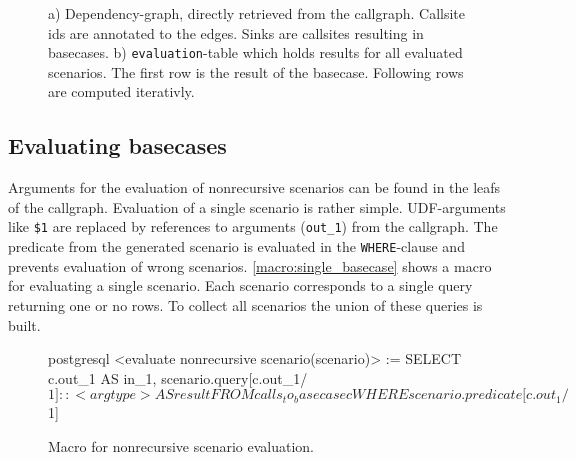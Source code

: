 \begin{figure}[h!]\small
    \begin{minipage}[b]{.45\linewidth}\small
    \centering
{}
    \subcaption{}\label{}
    \end{minipage}%
    \hfill
    \begin{minipage}[b]{.45\linewidth}\small
    \centering
    
    \subcaption{}\label{fig:fib_callstack_cte}
    \end{minipage}
    \caption{a) Dependency-graph, directly retrieved from the callgraph. Callsite ids are annotated to the edges. Sinks are callsites resulting in basecases. b) \texttt{evaluation}-table which holds results for all evaluated scenarios. The first row is the result of the basecase. Following rows are computed iterativly.}\label{}
    \vspace*{-1cm}
\end{figure}

\subsection{Evaluating basecases}
Arguments for the evaluation of nonrecursive scenarios can be found in the leafs of the callgraph.
Evaluation of a single scenario is rather simple. UDF-arguments like \texttt{\$1} are replaced by references to arguments (\texttt{out\_1}) from the callgraph. The predicate from the generated scenario is evaluated in the \texttt{WHERE}-clause and prevents evaluation of wrong scenarios. \autoref{macro:single_basecase} shows a macro for evaluating a single scenario. Each scenario corresponds to a single query returning one or no rows. To collect all scenarios the union of these queries is built.
\begin{figure}[h!]
    \centering
    \begin{cminted}{postgresql}
<evaluate nonrecursive scenario(scenario)>
 := SELECT c.out_1                               AS in_1, 
           scenario.query[c.out_1/$1]::<argtype> AS result
    FROM calls_to_basecase c
    WHERE scenario.predicate[c.out_1/$1]
    \end{cminted}
    \caption{Macro for nonrecursive scenario evaluation.}
    \label{macro:single_basecase}
\end{figure}

